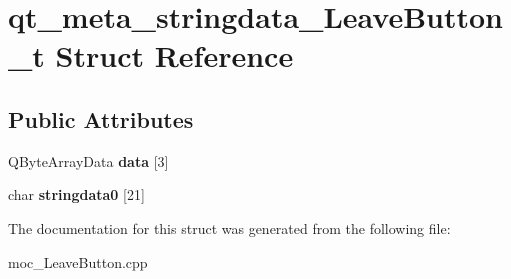 \hypertarget{structqt__meta__stringdata__LeaveButton__t}{}\section{qt\+\_\+meta\+\_\+stringdata\+\_\+\+Leave\+Button\+\_\+t Struct Reference}
\label{structqt__meta__stringdata__LeaveButton__t}
\subsection*{Public Attributes}
\begin{DoxyCompactItemize}
\item 
Q\+Byte\+Array\+Data {\bfseries data} \mbox{[}3\mbox{]}\hypertarget{structqt__meta__stringdata__LeaveButton__t_a5a11cfed22a640611908f530d22c7bdb}{}\label{structqt__meta__stringdata__LeaveButton__t_a5a11cfed22a640611908f530d22c7bdb}

\item 
char {\bfseries stringdata0} \mbox{[}21\mbox{]}\hypertarget{structqt__meta__stringdata__LeaveButton__t_a1e02b2859d0a62d1cffb61753c9f39a5}{}\label{structqt__meta__stringdata__LeaveButton__t_a1e02b2859d0a62d1cffb61753c9f39a5}

\end{DoxyCompactItemize}


The documentation for this struct was generated from the following file\+:\begin{DoxyCompactItemize}
\item 
moc\+\_\+\+Leave\+Button.\+cpp\end{DoxyCompactItemize}
